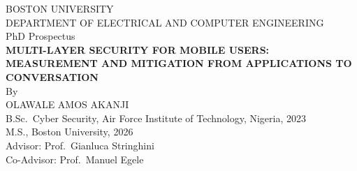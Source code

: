 \documentclass[letterpaper,11pt]{article}
\begin{document}
\begin{titlepage}
\begin{center}
\large
BOSTON UNIVERSITY\\[0.5em]
DEPARTMENT OF ELECTRICAL AND COMPUTER ENGINEERING\\[2em]
PhD Prospectus\\[3em]

{\bfseries MULTI-LAYER SECURITY FOR MOBILE USERS:
MEASUREMENT AND MITIGATION FROM APPLICATIONS TO CONVERSATION}\\[3em]
By\\[2em]

OLAWALE AMOS AKANJI\\
B.Sc.\ Cyber Security, Air Force Institute of Technology, Nigeria, 2023\\
M.S., Boston University, 2026\\[3em]

Advisor: Prof.\ Gianluca Stringhini\\
Co-Advisor: Prof.\ Manuel Egele
\end{center}

\vfill


\end{titlepage}
\end{document}
